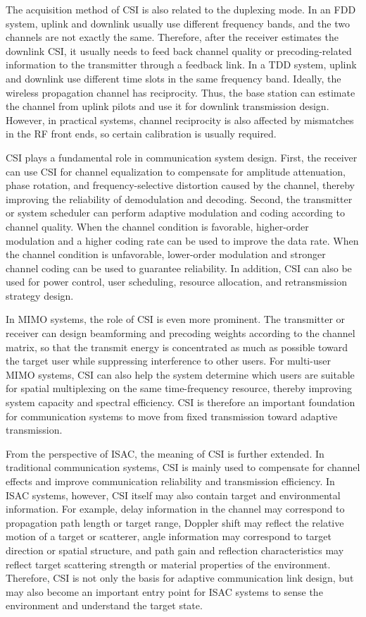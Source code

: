 The acquisition method of CSI is also related to the duplexing mode.
In an FDD system,
uplink and downlink usually use different frequency bands,
and the two channels are not exactly the same.
Therefore,
after the receiver estimates the downlink CSI,
it usually needs to feed back channel quality or precoding-related information to the transmitter through a feedback link.
In a TDD system,
uplink and downlink use different time slots in the same frequency band.
Ideally,
the wireless propagation channel has reciprocity.
Thus,
the base station can estimate the channel from uplink pilots
and use it for downlink transmission design.
However,
in practical systems,
channel reciprocity is also affected by mismatches in the RF front ends,
so certain calibration is usually required.

CSI plays a fundamental role in communication system design.
First,
the receiver can use CSI for channel equalization
to compensate for amplitude attenuation,
phase rotation,
and frequency-selective distortion caused by the channel,
thereby improving the reliability of demodulation and decoding.
Second,
the transmitter or system scheduler can perform adaptive modulation and coding according to channel quality.
When the channel condition is favorable,
higher-order modulation and a higher coding rate can be used to improve the data rate.
When the channel condition is unfavorable,
lower-order modulation and stronger channel coding can be used to guarantee reliability.
In addition,
CSI can also be used for power control,
user scheduling,
resource allocation,
and retransmission strategy design.

In MIMO systems,
the role of CSI is even more prominent.
The transmitter or receiver can design beamforming and precoding weights according to the channel matrix,
so that the transmit energy is concentrated as much as possible toward the target user
while suppressing interference to other users.
For multi-user MIMO systems,
CSI can also help the system determine which users are suitable for spatial multiplexing
on the same time-frequency resource,
thereby improving system capacity and spectral efficiency.
CSI is therefore an important foundation for communication systems
to move from fixed transmission toward adaptive transmission.

From the perspective of ISAC,
the meaning of CSI is further extended.
In traditional communication systems,
CSI is mainly used to compensate for channel effects
and improve communication reliability and transmission efficiency.
In ISAC systems,
however,
CSI itself may also contain target and environmental information.
For example,
delay information in the channel may correspond to propagation path length or target range,
Doppler shift may reflect the relative motion of a target or scatterer,
angle information may correspond to target direction or spatial structure,
and path gain and reflection characteristics may reflect target scattering strength
or material properties of the environment.
Therefore,
CSI is not only the basis for adaptive communication link design,
but may also become an important entry point for ISAC systems
to sense the environment and understand the target state.

